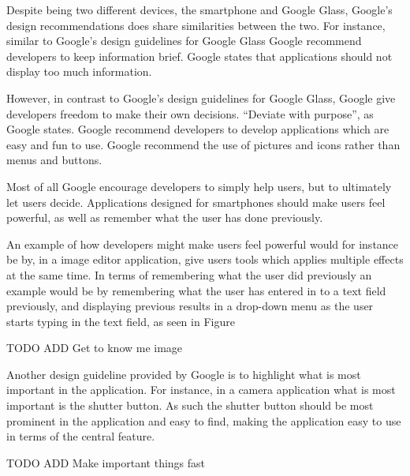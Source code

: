 Despite being two different devices, the smartphone and Google Glass, Google's design recommendations does share similarities between the two. For instance, similar to Google's design guidelines for Google Glass Google recommend developers to keep information brief. Google states that applications should not display too much information.

However, in contrast to Google's design guidelines for Google Glass, Google give developers freedom to make their own decisions. ``Deviate with purpose'', as Google states. Google recommend developers to develop applications which are easy and fun to use. Google recommend the use of pictures and icons rather than menus and buttons.

Most of all Google encourage developers to simply help users, but to ultimately let users decide. Applications designed for smartphones should make users feel powerful, as well as remember what the user has done previously.

An example of how developers might make users feel powerful would for instance be by, in a image editor application, give users tools which applies multiple effects at the same time. In terms of remembering what the user did previously an example would be by remembering what the user has entered in to a text field previously, and displaying previous results in a drop-down menu as the user starts typing in the text field, as seen in Figure~%

TODO ADD Get to know me image %

Another design guideline provided by Google is to highlight what is most important in the application. For instance, in a camera application what is most important is the shutter button. As such the shutter button should be most prominent in the application and easy to find, making the application easy to use in terms of the central feature.

TODO ADD Make important things fast %



